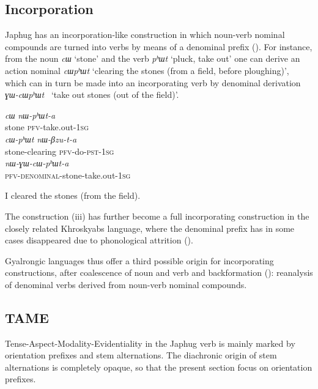 \documentclass[oneside,a4paper,11pt]{article}
\newcommand{\ipa}[1]{\mbox{\phon\textit{#1}}} %
\begin{document}
\subsection{Incorporation} \label{sec:incorp}
Japhug has an incorporation-like construction in which noun-verb nominal compounds are turned into verbs by means of a denominal prefix (\citealt{jacques12incorp}). For instance, from the noun \ipa{cɯ} `stone' and the verb \ipa{pʰɯt} `pluck, take out' one can derive an action nominal   \ipa{cɯpʰɯt} `clearing the stones (from a field, before ploughing)', which can in turn be made into an incorporating verb by denominal derivation  \ipa{ɣɯ-cɯpʰɯt } `take out stones (out of the field)'. 

\begin{exe}   
\ex
\begin{xlist}[(ii)]
\gll     \ipa{cɯ} \ipa{nɯ-pʰɯt-a}  \\
  stone \textsc{pfv}-take.out-\textsc{1sg} \\
\gll     \ipa{cɯ-pʰɯt} \ipa{nɯ-βzu-t-a}  \\
  stone-clearing \textsc{pfv}-do-\textsc{pst}-\textsc{1sg} \\
\gll     \ipa{nɯ-ɣɯ-cɯ-pʰɯt-a}  \\
  \textsc{pfv-denominal}-stone-take.out-\textsc{1sg} \\
  \end{xlist}
  \glt   I cleared the stones (from the field). 
\end{exe}   

The construction (iii) has further become a full incorporating construction in the closely related Khroskyabs language, where the denominal prefix has in some cases disappeared due to phonological attrition (\citealt{lai13affixale}).

Gyalrongic languages thus offer a third possible origin for incorporating constructions, after coalescence of noun and verb and backformation (\citealt{mithun84incorp}): reanalysis of denominal verbs derived from noun-verb nominal compounds.


\subsection{TAME}
Tense-Aspect-Modality-Evidentiality in the Japhug verb is mainly marked by orientation prefixes and stem alternations. The diachronic origin of stem alternations is completely opaque, so that the present section focus on orientation prefixes. 
\end{document}
